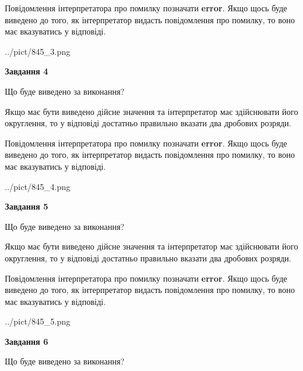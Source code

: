 \documentclass[12pt, ukrainian]{article}
\begin{document}
{\begin {Large}
Повідомлення інтерпретатора про помилку позначати \textbf{error}.
Якщо щось буде виведено до того, як інтерпретатор видасть повідомлення про помилку, 
то воно має вказуватись у відповіді. \par

\begin{center}
	{../pict/845_3.png}
\end{center}
\newpage

{\begin {center}\textbf{Завдання 4}\end {center}}\par
Що буде виведено за виконання? \par

Якщо має бути виведено дійсне значення та інтерпретатор має здійснювати його округлення, 
то у відповіді достатньо правильно вказати два дробових розряди.

Повідомлення інтерпретатора про помилку позначати \textbf{error}.
Якщо щось буде виведено до того, як інтерпретатор видасть повідомлення про помилку, 
то воно має вказуватись у відповіді. \par

\begin{center}
	{../pict/845_4.png}
\end{center}
\newpage

{\begin {center}\textbf{Завдання 5}\end {center}}\par
Що буде виведено за виконання? \par

Якщо має бути виведено дійсне значення та інтерпретатор має здійснювати його округлення, 
то у відповіді достатньо правильно вказати два дробових розряди.

Повідомлення інтерпретатора про помилку позначати \textbf{error}.
Якщо щось буде виведено до того, як інтерпретатор видасть повідомлення про помилку, 
то воно має вказуватись у відповіді. \par

\begin{center}
	{../pict/845_5.png}
\end{center}
\newpage

{\begin {center}\textbf{Завдання 6}\end {center}}\par
Що буде виведено за виконання? \par


\end{Large}}
\end{document}
